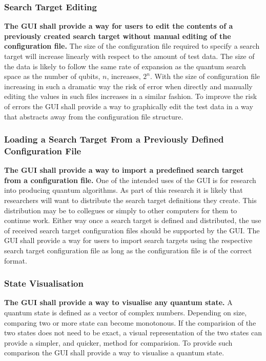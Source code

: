 \documentclass[authoryearcitations]{UoYCSproject}
\begin{document}
\subsubsection{Search Target Editing}
\textbf{The GUI shall provide a way for users to edit the contents of a previously created search target without manual editing of the configuration file.}
The size of the configuration file required to specify a search target will increase linearly with respect to the amount of test data.
The size of the data is likely to follow the same rate of expansion as the quantum search space as the number of qubits, $n$, increases, $2^n$.
With the size of configuration file increasing in such a dramatic way the risk of error when directly and manually editing the values in such files increases in a similar fashion.
To improve the risk of errors the GUI shall provide a way to graphically edit the test data in a way that abstracts away from the configuration file structure.

\subsubsection{Loading a Search Target From a Previously Defined Configuration File}
\textbf{The GUI shall provide a way to import a predefined search target from a configuration file.}
One of the intended uses of the GUI is for research into producing quantum algorithms.
As part of this research it is likely that researchers will want to distribute the search target definitions they create.
This distribution may be to collegues or simply to other computers for them to continue work.
Either way once a search target is defined and distributed, the use of received search target configuration files should be supported by the GUI.
The GUI shall provide a way for users to import search targets using the respective search target configuration file as long as the configuration file is of the correct format.

\subsubsection{State Visualisation}
\textbf{The GUI shall provide a way to visualise any quantum state.}
A quantum state is defined as a vector of complex numbers.
Depending on size, comparing two or more state can become monotonous.
If the comparision of the two states does not need to be exact, a visual representation of the two states can provide a simpler, and quicker, method for comparision.
To provide such comparison the GUI shall provide a way to visualise a quantum state.
\end{document}
